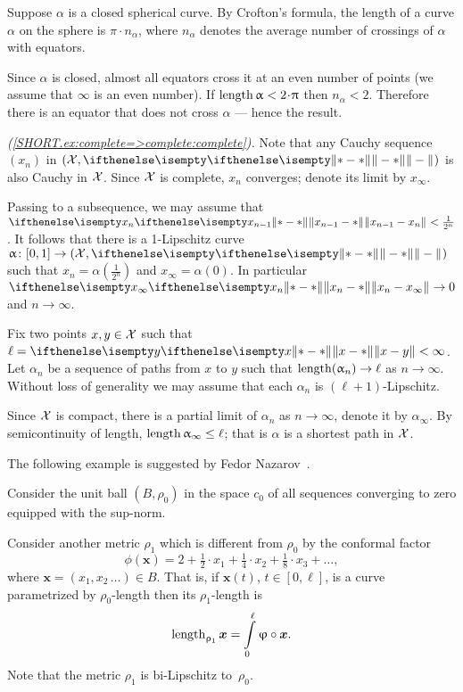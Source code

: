 Suppose $\alpha$ is a closed spherical curve. 
By Crofton's formula, the length of a curve $\alpha$ on the sphere is $\pi\cdot n_\alpha$, where $n_\alpha$ denotes the average number of crossings of $\alpha$ with equators.

Since $\alpha$ is closed, almost all equators cross it at an even number of points (we assume that $\infty$ is an even number).
If $\length \alpha<2\cdot\pi$ then $n_\alpha<2$.
Therefore there is an equator that does not cross $\alpha$ --- hence the result.


\parbf{\ref{ex:complete=>complete};}
\textit{(\ref{SHORT.ex:complete=>complete:complete}).}
Note that any Cauchy sequence $(x_n)$ in $(\spc{X},\yetdist{}{}{})$ is also Cauchy in $\mathcal{X}$.
Since $\mathcal{X}$ is complete, $x_n$ converges; denote its limit by $x_\infty$.

Passing to a subsequence, we may assume that $\yetdist{x_{n-1}}{x_n}{}<\tfrac1{2^n}$.
It follows that there is a 1-Lipschitz curve $\alpha\:[0,1]\to (\spc{X},\yetdist{}{}{})$ such that $x_n=\alpha(\tfrac1{2^n})$ and $x_\infty=\alpha(0)$.
In particular $\yetdist{x_n}{x_\infty}{}\to0$ and $n\to\infty$.

Fix two points $x,y\in\spc{X}$ such that $\ell=\yetdist{x}{y}{}<\infty$.
Let $\alpha_n$ be a sequence of paths from $x$ to $y$ such that $\length(\alpha_n)\to\ell$ as $n\to \infty$.
Without loss of generality we may assume that each $\alpha_n$ is $(\ell+1)$-Lipschitz.

Since $\mathcal{X}$ is compact, there is a partial limit of $\alpha_n$ as $n\to \infty$,
denote it by $\alpha_\infty$.
By semicontinuity of length, $\length\alpha_\infty\le\ell$;
that is $\alpha$ is a shortest path in $\mathcal{X}$.

The following example is suggested by Fedor Nazarov~\cite{nazarov}.

\medskip

Consider the unit ball $(B,\rho_0)$
in the space $c_0$ of all sequences converging to zero equipped with the sup-norm.

Consider another metric $\rho_1$ which is different from $\rho_0$ by the conformal factor
\[\phi(\bm{x})=2+\tfrac{1}2\cdot x_1+\tfrac{1}4\cdot x_2+\tfrac{1}8\cdot x_3+\dots,\]
where $\bm{x}=(x_1,x_2\,\dots)\in B$.
That is, if $\bm{x}(t)$, $t\in[0,\ell]$, is a curve parametrized by $\rho_0$-length 
then its $\rho_1$-length is 
\[\length_{\rho_1}\bm{x}=\int\limits_0^\ell\phi\circ\bm{x}.\]
Note that the metric $\rho_1$ is bi-Lipschitz to~$\rho_0$.

